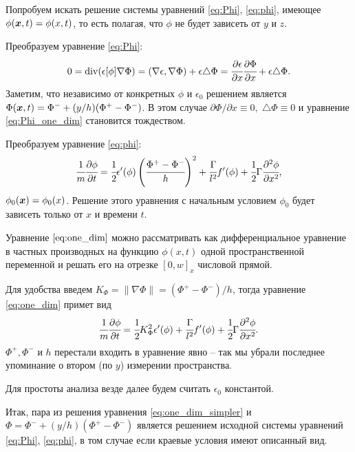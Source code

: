 Попробуем искать решение системы уравнений \eqref{eq:Phi}, \eqref{eq:phi}, имеющее $\phi({\boldsymbol{x}}, t) = \phi(x, t)$, то есть полагая, что $\phi$ не будет зависеть от $y$ и $z$.

Преобразуем уравнение \eqref{eq:Phi}:
\begin{equation}
	0 = \operatorname{div}(\epsilon[\phi] \nabla \Phi) = (\nabla \epsilon, \nabla \Phi) + \epsilon \triangle \Phi = \cfrac{\partial \epsilon}{\partial x} \cfrac{\partial \Phi}{\partial x} + \epsilon \triangle \Phi {\text{.}}
	\label{eq:Phi_one_dim}
\end{equation}
Заметим, что независимо от конкретных $\phi$ и $\epsilon_0$ решением является $\Phi({\boldsymbol{x}}, t) = \Phi^- + (y/h)(\Phi^+ - \Phi^-)$. В этом случае $\partial \Phi / \partial x \equiv 0, \; \triangle \Phi \equiv 0$ и уравнение \eqref{eq:Phi_one_dim} становится тождеством.

Преобразуем уравнение \eqref{eq:phi}:
\begin{equation}
	\cfrac{1}{m} \cfrac{\partial \phi}{\partial t} = \cfrac{1}{2} \epsilon'(\phi) \left( \cfrac{\Phi^+ - \Phi^-}{h} \right)^2 + \cfrac{\Gamma}{l^2} f'(\phi) + \cfrac{1}{2} \Gamma \cfrac{\partial^2 \phi}{\partial x^2} {\text{,}}
	\label{eq:one_dim}
\end{equation}
$\phi_0({\boldsymbol{x}}) = \phi_0(x)$. Решение этого уравнения с начальным условием $\phi_0$ будет зависеть только от $x$ и времени $t$.

Уравнение $\eqref{eq:one_dim}$ можно рассматривать как дифференциальное уравнение в частных производных на функцию $\phi(x, t)$ одной пространственной переменной и решать его на отрезке $[0, w]_x$ числовой прямой.

Для удобства введем $K_\Phi = \|\nabla \Phi\| = (\Phi^+ - \Phi^-)/h$, тогда уравнение \eqref{eq:one_dim} примет вид
\begin{equation}
	\cfrac{1}{m} \cfrac{\partial \phi}{\partial t} = \cfrac{1}{2} K_\Phi^2 \epsilon'(\phi) + \cfrac{\Gamma}{l^2} f'(\phi) + \cfrac{1}{2} \Gamma \cfrac{\partial^2 \phi}{\partial x^2} {\text{.}}
	\label{eq:one_dim_simpler}
\end{equation}
$\Phi^+, \Phi^-$ и $h$ перестали входить в уравнение явно -- так мы убрали последнее упоминание о втором (по $y$) измерении пространства.

Для простоты анализа везде далее будем считать $\epsilon_0$ константой.

Итак, пара из решения уравнения \eqref{eq:one_dim_simpler} и $\Phi = \Phi^- + (y/h)(\Phi^+ - \Phi^-)$ является решением исходной системы уравнений \eqref{eq:Phi}, \eqref{eq:phi}, в том случае если краевые условия имеют описанный вид.